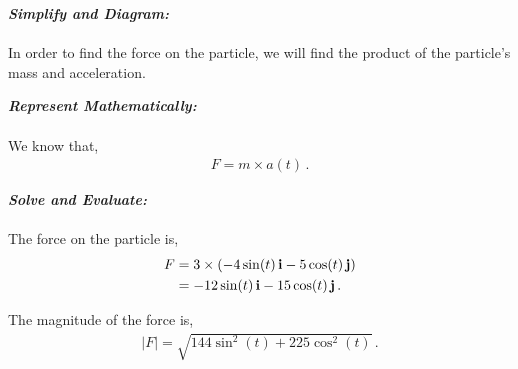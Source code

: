 \begin{subquestions}
\begin{subsubquestions}

\subsubquestion

\textbf{\textit{Simplify and Diagram:}} \\ \\
In order to find the force on the particle, we will find the product of the particle's mass and acceleration.




\textbf{\textit{Represent Mathematically:}} \\ \\
We know that,
\begin{align}
	F = m \times a(t) \,.
\end{align}




\textbf{\textit{Solve and Evaluate:}} \\ \\
The force on the particle is,
\begin{align}
	F & = 3 \times \left(-4\sin(t)\,\mathbf{i} - 5\cos(t)\,\mathbf{j}\right) \nonumber \\
	& = -12\sin(t) \,\mathbf{i} - 15\cos(t)\,\mathbf{j} \,.
\end{align}

The magnitude of the force is,
\begin{align}
	|F| = \sqrt{144\sin^2(t)+225\cos^2(t)} \,.	
\end{align}

\end{subsubquestions}

\end{subquestions}